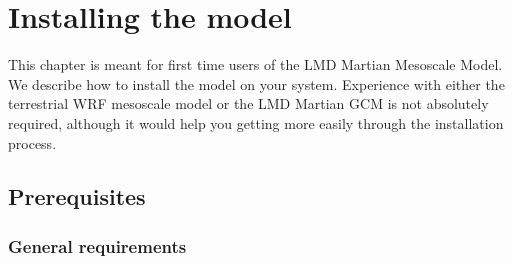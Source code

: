 \chapter{Installing the model}\label{install}

\vk
This chapter is meant for first time users of the LMD Martian Mesoscale Model. We describe how to install the model on your system. Experience with either the terrestrial WRF mesoscale model or the LMD Martian GCM is not absolutely required, although it would help you getting more easily through the installation process.

\mk
\section{Prerequisites}

\sk
\subsection{General requirements}

